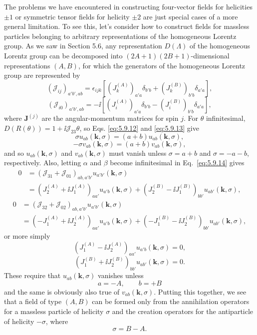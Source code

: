 The problems we have encountered in constructing four-vector fields for
helicities $\pm1$ or symmetric tensor fields for helicity $\pm2$ are just
special cases of a more general limitation. To see this, let's consider how to
construct fields for massless particles belonging to arbitrary representations
of the homogeneous Lorentz group. As we saw in Section 5.6, any representation
$D(\Lambda)$ of the homogeneous Lorentz group can be decomposed into
$(2A+1)(2B+1)$-dimensional representations $(A,B)$, for which the generators
of the homogeneous Lorentz group are represented by
\[
(\mathcal J_{ij})_{a'b',ab}=\epsilon_{ijk}
[(J_k^{(A)})_{a'a}\delta_{b'b}+(J_k^{(B)})_{b'b}\delta_{a'a}],
\]
\[
(\mathcal J_{i0})_{a'b',ab}=-\ii
[(J_i^{(A)})_{a'a}\delta_{b'b}-(J_i^{(B)})_{b'b}\delta_{a'a}],
\]
where $\mathbf J^{(j)}$ are the angular-momentum matrices for spin $j$. For
$\theta$ infinitesimal, $D(R(\theta))=1+\ii\mathcal J_{23}\theta$, so Eqs.
\eqref{eq:5.9.12} and \eqref{eq:5.9.13} give
\[
\sigma u_{ab}(\mathbf k,\sigma)=(a+b)u_{ab}(\mathbf k,\sigma),
\]
\[
-\sigma v_{ab}(\mathbf k,\sigma)=(a+b)v_{ab}(\mathbf k,\sigma),
\]
and so $u_{ab}(\mathbf k,\sigma)$ and $v_{ab}(\mathbf k,\sigma)$ must vanish
unless $\sigma=a+b$ and $\sigma=-a-b$, respectively. Also, letting $\alpha$
and $\beta$ become infinitesimal in Eq.~\eqref{eq:5.9.14} gives
\begin{align*}
0&=(\mathcal J_{31}+\mathcal J_{01})_{ab,a'b'}
u_{a'b'}(\mathbf k,\sigma)\\
&=(J_2^{(A)}+\ii J_1^{(A)})_{aa'}u_{a'b}(\mathbf k,\sigma)
+(J_2^{(B)}-\ii J_1^{(B)})_{bb'}u_{ab'}(\mathbf k,\sigma),
\end{align*}
\begin{align*}
0&=(\mathcal J_{32}+\mathcal J_{02})_{ab,a'b'}
u_{a'b'}(\mathbf k,\sigma)\\
&=(-J_1^{(A)}+\ii J_2^{(A)})_{aa'}u_{a'b}(\mathbf k,\sigma)
+(-J_1^{(B)}-\ii J_2^{(B)})_{bb'}u_{ab'}(\mathbf k,\sigma),
\end{align*}
or more simply
\[
(J_1^{(A)}-\ii J_2^{(A)})_{aa'}u_{a'b}(\mathbf k,\sigma)=0,
\]
\[
(J_1^{(B)}+\ii J_2^{(B)})_{bb'}u_{ab'}(\mathbf k,\sigma)=0.
\]
These require that $u_{ab}(\mathbf k,\sigma)$ vanishes unless
\begin{equation}
a=-A,\qquad b=+B
\tag{5.9.40}\label{eq:5.9.40}
\end{equation}
and the same is obviously also true of $v_{ab}(\mathbf k,\sigma)$. Putting this
together, we see that a field of type $(A,B)$ can be formed only from the
annihilation operators for a massless particle of helicity $\sigma$ and the
creation operators for the antiparticle of helicity $-\sigma$, where
\begin{equation}
\sigma=B-A.
\tag{5.9.41}\label{eq:5.9.41}
\end{equation}

